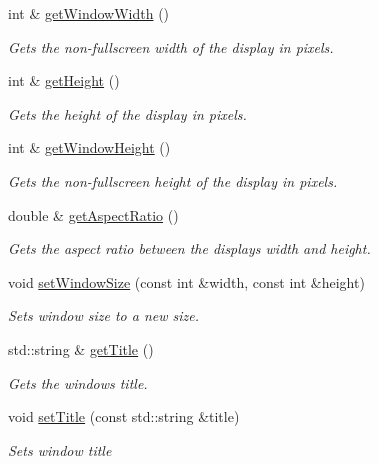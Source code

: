 \begin{DoxyCompactItemize}
int \& \hyperlink{classflounder_1_1display_ac47027c6b34d260ccaf148e4e762cdbe}{get\+Window\+Width} ()
\begin{DoxyCompactList}\small\item\em Gets the non-\/fullscreen width of the display in pixels. \end{DoxyCompactList}\item 
int \& \hyperlink{classflounder_1_1display_a2b3cea6e41121de9d790acf027036167}{get\+Height} ()
\begin{DoxyCompactList}\small\item\em Gets the height of the display in pixels. \end{DoxyCompactList}\item 
int \& \hyperlink{classflounder_1_1display_af1d306cb8353a7cdfe7daae4727028fc}{get\+Window\+Height} ()
\begin{DoxyCompactList}\small\item\em Gets the non-\/fullscreen height of the display in pixels. \end{DoxyCompactList}\item 
double \& \hyperlink{classflounder_1_1display_a7b32aeb7809ad48663ce6eb4596b37a3}{get\+Aspect\+Ratio} ()
\begin{DoxyCompactList}\small\item\em Gets the aspect ratio between the displays width and height. \end{DoxyCompactList}\item 
void \hyperlink{classflounder_1_1display_a13edcfe35505b3e164010ed1b232e5d1}{set\+Window\+Size} (const int \&width, const int \&height)
\begin{DoxyCompactList}\small\item\em Sets window size to a new size. \end{DoxyCompactList}\item 
std\+::string \& \hyperlink{classflounder_1_1display_ad5fc46c79d236783ac883878ec065f36}{get\+Title} ()
\begin{DoxyCompactList}\small\item\em Gets the window\textquotesingle{}s title. \end{DoxyCompactList}\item 
void \hyperlink{classflounder_1_1display_a48680d3ed1b6842dea7eb5437d6c336f}{set\+Title} (const std\+::string \&title)
\begin{DoxyCompactList}\small\item\em Sets window title \end{DoxyCompactList}\item 

\end{DoxyCompactItemize}
